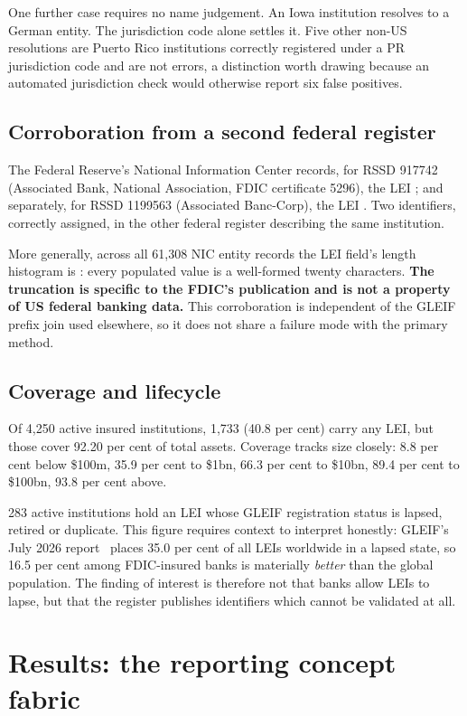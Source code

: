 \documentclass[11pt]{article}
\begin{document}
One further case requires no name judgement. An Iowa institution resolves to a German entity. The jurisdiction code alone settles it. Five other non-US resolutions are Puerto Rico institutions correctly registered under a PR jurisdiction code and are not errors, a distinction worth drawing because an automated jurisdiction check would otherwise report six false positives.

\subsection{Corroboration from a second federal register}
The Federal Reserve's National Information Center records, for RSSD 917742 (Associated Bank, National Association, FDIC certificate 5296), the LEI ; and separately, for RSSD 1199563 (Associated Banc-Corp), the LEI . Two identifiers, correctly assigned, in the other federal register describing the same institution.

More generally, across all 61,308 NIC entity records the LEI field's length histogram is : every populated value is a well-formed twenty characters. \textbf{The truncation is specific to the FDIC's publication and is not a property of US federal banking data.} This corroboration is independent of the GLEIF prefix join used elsewhere, so it does not share a failure mode with the primary method.

\subsection{Coverage and lifecycle}
Of 4,250 active insured institutions, 1,733 (40.8 per cent) carry any LEI, but those cover 92.20 per cent of total assets. Coverage tracks size closely: 8.8 per cent below \$100m, 35.9 per cent to \$1bn, 66.3 per cent to \$10bn, 89.4 per cent to \$100bn, 93.8 per cent above.

283 active institutions hold an LEI whose GLEIF registration status is lapsed, retired or duplicate. This figure requires context to interpret honestly: GLEIF's July 2026 report~\cite{gleifdq} places 35.0 per cent of all LEIs worldwide in a lapsed state, so 16.5 per cent among FDIC-insured banks is materially \emph{better} than the global population. The finding of interest is therefore not that banks allow LEIs to lapse, but that the register publishes identifiers which cannot be validated at all.

\section{Results: the reporting concept fabric}
\label{sec:mdrm}
\end{document}
